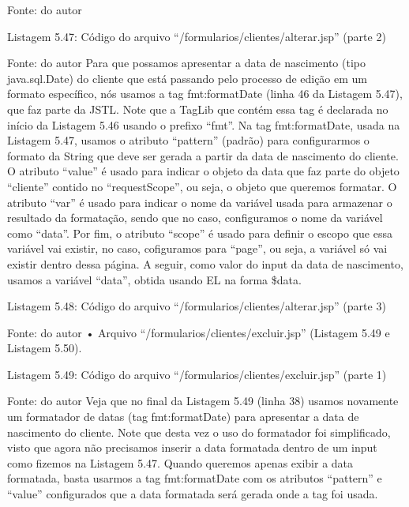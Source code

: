 Fonte: do autor







Listagem 5.47: Código do arquivo ``/formularios/clientes/alterar.jsp'' (parte 2)
 
Fonte: do autor
Para que possamos apresentar a data de nascimento (tipo java.sql.Date) do cliente que está passando pelo processo de edição em um formato específico, nós usamos a tag fmt:formatDate (linha 46 da Listagem 5.47), que faz parte da JSTL. Note que a TagLib que contém essa tag é declarada no início da Listagem 5.46 usando o prefixo ``fmt''. Na tag fmt:formatDate, usada na Listagem 5.47, usamos o atributo ``pattern'' (padrão) para configurarmos o formato da String que deve ser gerada a partir da data de nascimento do cliente. O atributo ``value'' é usado para indicar o objeto da data que faz parte do objeto ``cliente'' contido no ``requestScope'', ou seja, o objeto que queremos formatar. O atributo ``var'' é usado para indicar o nome da variável usada para armazenar o resultado da formatação, sendo que no caso, configuramos o nome da variável como ``data''. Por fim, o atributo ``scope'' é usado para definir o escopo que essa variável vai existir, no caso, cofiguramos para ``page'', ou seja, a variável só vai existir dentro dessa página. A seguir, como valor do input da data de nascimento, usamos a variável ``data'', obtida usando EL na forma \${data}.





















Listagem 5.48: Código do arquivo ``/formularios/clientes/alterar.jsp'' (parte 3)
 
Fonte: do autor
•	Arquivo ``/formularios/clientes/excluir.jsp'' (Listagem 5.49 e Listagem 5.50).

Listagem 5.49: Código do arquivo ``/formularios/clientes/excluir.jsp'' (parte 1)
 
Fonte: do autor
Veja que no final da Listagem 5.49 (linha 38) usamos novamente um formatador de datas (tag fmt:formatDate) para apresentar a data de nascimento do cliente. Note que desta vez o uso do formatador foi simplificado, visto que agora não precisamos inserir a data formatada dentro de um input como fizemos na Listagem 5.47. Quando queremos apenas exibir a data formatada, basta usarmos a tag fmt:formatDate com os atributos ``pattern'' e ``value'' configurados que a data formatada será gerada onde a tag foi usada.


